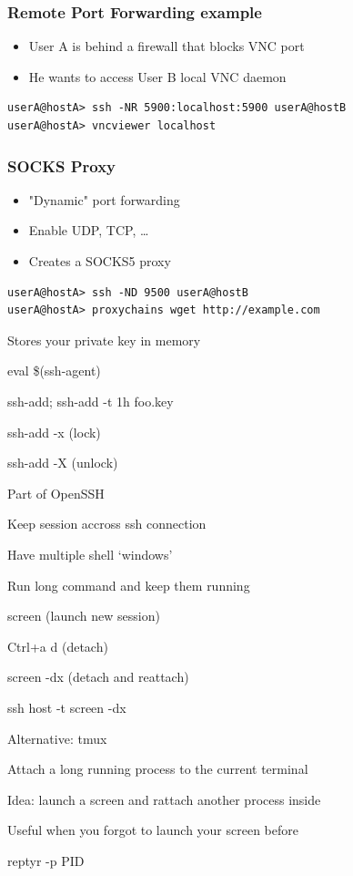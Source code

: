 \begin{frame}[fragile]
\frametitle{Remote Port Forwarding example}
\begin{itemize}
\item User A is behind a firewall that blocks VNC port
\item He wants to access User B local VNC daemon
\end{itemize}
\begin{lstlisting}
userA@hostA> ssh -NR 5900:localhost:5900 userA@hostB
userA@hostA> vncviewer localhost
\end{lstlisting}

\end{frame}
\begin{frame}[fragile]
\frametitle{SOCKS Proxy}
\begin{itemize}
\item "Dynamic" port forwarding
\item Enable UDP, TCP, \dots
\item Creates a SOCKS5 proxy
\end{itemize}
\begin{lstlisting}
userA@hostA> ssh -ND 9500 userA@hostB
userA@hostA> proxychains wget http://example.com
\end{lstlisting}

\end{frame}


\begin{iframe}
\item Stores your private key in memory
\item eval \$(ssh-agent)
\item ssh-add; ssh-add -t 1h foo.key
\item ssh-add -x (lock)
\item ssh-add -X (unlock)
\item Part of OpenSSH
\end{iframe}
\begin{iframe}[screen]
\item Keep session accross ssh connection
\item Have multiple shell `windows'
\item Run long command and keep them running
\item screen (launch new session)
\item Ctrl+a d (detach)
\item screen -dx (detach and reattach)
\item ssh host -t screen -dx
\item Alternative: tmux
\end{iframe}
\begin{iframe}[reptyr]
\item Attach a long running process to the current terminal
\item Idea: launch a screen and rattach another process inside
\item Useful when you forgot to launch your screen before
\item reptyr -p PID
\end{iframe}

